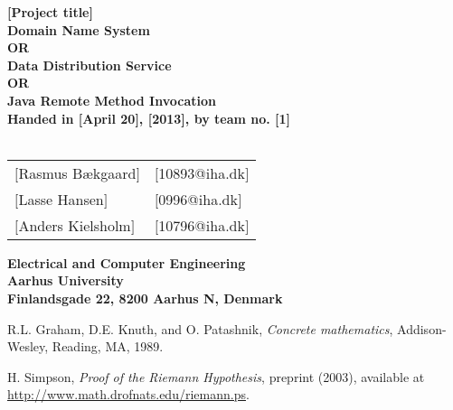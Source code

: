 \documentclass[a4paper,10pt]{report}
\begin{document}
\begin{titlepage}
\begin{center}
{\LARGE \textbf{[Project title]}}\\
{\large \textbf{Domain Name System\\ OR\\ Data Distribution Service\\ OR\\ Java Remote Method Invocation}}\\


\vspace{4cm}
\textbf{Handed in [April 20], [2013], by team no. [1]}\\~\\
\begin{tabular}{ll}
$[$Rasmus Bækgaard$]$  & $[$10893@iha.dk$]$ \\
$[$Lasse Hansen$]$  & $[$0996@iha.dk$]$ \\
$[$Anders Kielsholm$]$  & $[$10796@iha.dk$]$ \\
\end{tabular}
\vfill
\textbf{Electrical and Computer Engineering}\\
\textbf{Aarhus University}\\
\textbf{Finlandsgade 22, 8200 Aarhus N, Denmark}
\end{center}
\end{titlepage}












\begin{thebibliography}{9}

R.L. Graham, D.E. Knuth, and O. Patashnik, \emph{Concrete
mathematics}, Addison-Wesley, Reading, MA, 1989.

 H. Simpson, \emph{Proof of the Riemann
Hypothesis},  preprint (2003), available at 
\url{http://www.math.drofnats.edu/riemann.ps}.

\end{thebibliography}
\end{document}
